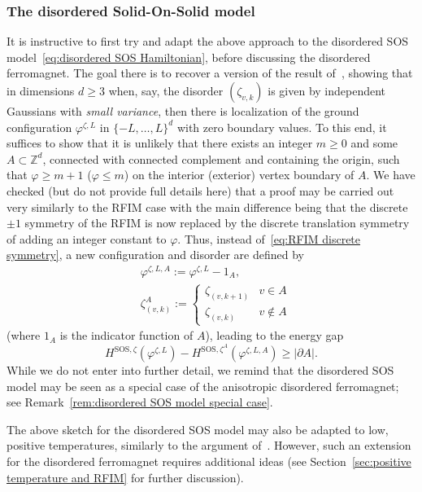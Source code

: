 \documentclass[11pt, reqno]{amsart}
\newcommand{\Z}{\mathbb{Z}}
\numberwithin{equation}{section}
\begin{document}
\subsubsection{The disordered Solid-On-Solid model} It is instructive to first try and adapt the above approach to the disordered SOS model~\eqref{eq:disordered SOS Hamiltonian}, before discussing the disordered ferromagnet. The goal there is to recover a version of the result of~\cite{BK}, showing that in dimensions $d\ge 3$ when, say, the disorder $(\zeta_{v,k})$ is given by independent Gaussians with \emph{small variance}, then there is localization of the ground configuration  $\varphi^{\zeta,L}$ in $\{-L,\ldots, L\}^d$ with zero boundary values. To this end, it suffices to show that it is unlikely that there exists an integer $m\ge 0$ and some $A\subset\Z^d$, connected with connected complement and containing the origin, such that $\varphi\ge m+1$ ($\varphi\le m$) on the interior (exterior) vertex boundary of $A$. We have checked (but do not provide full details here) that a proof may be carried out very similarly to the RFIM case with the main difference being that the discrete $\pm1$ symmetry of the RFIM is now replaced by the discrete translation symmetry of adding an integer constant to $\varphi$. Thus, instead of~\eqref{eq:RFIM discrete symmetry}, a new configuration and disorder are defined by
\begin{equation}\label{eq:SOS discrete symmetry}
\begin{split}
&\varphi^{\zeta,L,A}:=\varphi^{\zeta,L}-1_A,\\
&\zeta^A_{(v,k)}:=\begin{cases}\zeta_{(v,k+1)}&v\in A\\
\zeta_{(v,k)}&v\notin A
\end{cases}
\end{split}
\end{equation}
(where $1_A$ is the indicator function of $A$), leading to the energy gap
\begin{equation}\label{eq:SOS energy gap}
H^{\text{SOS}, \zeta}(\varphi^{\zeta,L})-H^{\text{SOS}, \zeta^A}(\varphi^{\zeta,L,A}) \ge |\partial A|.
\end{equation}
While we do not enter into further detail, we remind that the disordered SOS model may be seen as a special case of the anisotropic disordered ferromagnet; see Remark~\ref{rem:disordered SOS model special case}.

The above sketch for the disordered SOS model may also be adapted to low, positive temperatures, similarly to the argument of~\cite{DZ}. However, such an extension for the disordered ferromagnet requires additional ideas (see Section~\ref{sec:positive temperature and RFIM} for further discussion).
\end{document}
